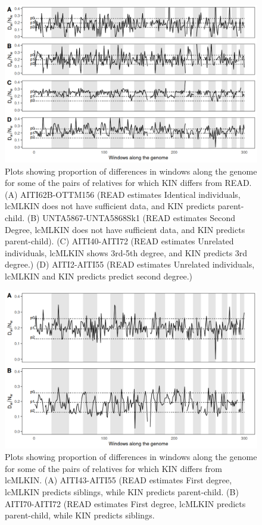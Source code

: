 \documentclass[12pt, letterpaper]{article}
\begin{document}
\begin{figure}[!ht]
    \centering
    \includegraphics[width=18cm]{supplementary_info/plots/egplot1.png}
    \caption{Plots showing proportion of differences in windows along the genome for some of the pairs of relatives for which KIN differs from READ. (A) AITI62B-OTTM156 (READ estimates Identical individuals, lcMLKIN does not have sufficient data, and KIN predicts parent-child. (B) UNTA5867-UNTA5868Sk1 (READ estimates Second Degree, lcMLKIN does not have sufficient data, and KIN predicts parent-child). (C) AITI40-AITI72 (READ estimates Unrelated individuals, lcMLKIN shows 3rd-5th degree, and KIN predicts 3rd degree.)
    (D) AITI2-AITI55 (READ estimates Unrelated individuals, lcMLKIN and KIN predicts predict second degree.)}
    \label{figS8:eg1}
\end{figure}

\begin{figure}[h]
    \centering
    \includegraphics[width=18cm]{supplementary_info/plots/egplot2.png}
    \caption{Plots showing proportion of differences in windows along the genome for some of the pairs of relatives for which KIN differs from lcMLKIN. (A) AITI43-AITI55 (READ estimates First degree, lcMLKIN predicts siblings, while KIN predicts parent-child. (B) AITI70-AITI72 (READ estimates First degree, lcMLKIN predicts parent-child, while KIN predicts siblings.}
    \label{figS9:eg2}
\end{figure}
\end{document}
